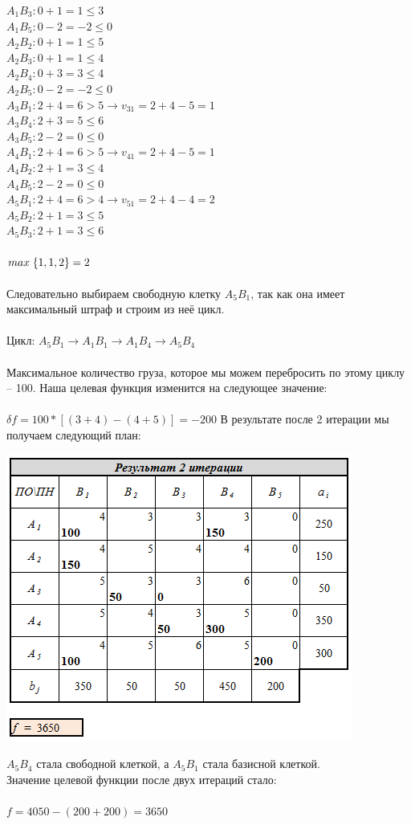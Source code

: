 \documentclass[14pt,a4paper,fleqn]{extarticle}
\begin{document}
$A_1B_3: 0 + 1 = 1 \leq 3$\\
$A_1B_5: 0 - 2 = -2 \leq 0$\\
$A_2B_2: 0 + 1 = 1 \leq 5$\\
$A_2B_3: 0 + 1 = 1 \leq 4$\\
$A_2B_4: 0 + 3 = 3 \leq 4$\\
$A_2B_5: 0 - 2 = -2 \leq 0$\\
$A_3B_1: 2 + 4 = 6 > 5 \rightarrow v_{31} = 2 + 4 - 5 = 1$\\
$A_3B_4: 2 + 3 = 5 \leq 6$\\
$A_3B_5: 2 - 2 = 0 \leq 0$\\
$A_4B_1: 2 + 4 = 6 > 5 \rightarrow v_{41} = 2 + 4 - 5 = 1$\\
$A_4B_2: 2 + 1 = 3 \leq 4$\\
$A_4B_5: 2 - 2 = 0 \leq 0$\\
$A_5B_1: 2 + 4 = 6 > 4 \rightarrow v_{51} = 2 + 4 - 4 = 2$\\
$A_5B_2: 2 + 1 = 3 \leq 5$\\
$A_5B_3: 2 + 1 = 3 \leq 6$\\\\
$max\hspace*{0.1cm}\{1,1,2\} = 2$\\\\
Следовательно выбираем свободную клетку $A_5B_1$, так как она имеет максимальный штраф и строим из неё цикл.\\\\
Цикл: $A_5B_1 \rightarrow A_1B_1 \rightarrow A_1B_4 \rightarrow A_5B_4$\\\\
Максимальное количество груза, которое мы можем перебросить по этому циклу -- 100. Наша целевая функция изменится на следующее значение:\\\\
$\delta f = 100*[(3+4)-(4+5)] = -200$
\newpage
В результате после 2 итерации мы получаем следующий план:
\begin{center}
	\includegraphics[scale=0.5]{39}
\end{center}
$A_5B_4$ стала свободной клеткой, а $A_5B_1$ стала базисной клеткой.\\
Значение целевой функции после двух итераций стало:\\\\
$f = 4050-(200+200) = 3650$
\end{document}
